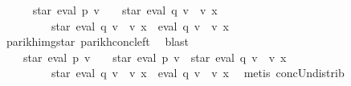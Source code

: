 \begin{isabellebody}
\ \isamarkupfalse%
\ {\isachardoublequoteopen}{\isasymdots}\ {\isacharequal}{\kern0pt}\ {\isasymPsi}\ {\isacharparenleft}{\kern0pt}star\ {\isacharparenleft}{\kern0pt}eval\ p\ v{\isacharparenright}{\kern0pt}\ {\isacharat}{\kern0pt}{\isacharat}{\kern0pt}\ {\isacharparenleft}{\kern0pt}{\isacharbraceleft}{\kern0pt}{\isacharbrackleft}{\kern0pt}{\isacharbrackright}{\kern0pt}{\isacharbraceright}{\kern0pt}\ {\isasymunion}\ star\ {\isacharparenleft}{\kern0pt}eval\ q\ v\ {\isacharat}{\kern0pt}{\isacharat}{\kern0pt}\ v\ x{\isacharparenright}{\kern0pt}\isanewline
\ \ \ \ \ \ \ \ {\isacharat}{\kern0pt}{\isacharat}{\kern0pt}\ star\ {\isacharparenleft}{\kern0pt}eval\ q\ v\ {\isacharat}{\kern0pt}{\isacharat}{\kern0pt}\ v\ x{\isacharparenright}{\kern0pt}\ {\isacharat}{\kern0pt}{\isacharat}{\kern0pt}\ eval\ q\ v\ {\isacharat}{\kern0pt}{\isacharat}{\kern0pt}\ v\ x{\isacharparenright}{\kern0pt}{\isacharparenright}{\kern0pt}{\isachardoublequoteclose}\isanewline
\ \ \ \ \ \ \isamarkupfalse%
\ parikh{\isacharunderscore}{\kern0pt}img{\isacharunderscore}{\kern0pt}star{}\ parikh{\isacharunderscore}{\kern0pt}conc{\isacharunderscore}{\kern0pt}left\ \isamarkupfalse%
\ blast\isanewline
\ \ \ \ \isamarkupfalse%
\ \isamarkupfalse%
\ {\isachardoublequoteopen}{\isasymdots}\ {\isacharequal}{\kern0pt}\ {\isasymPsi}\ {\isacharparenleft}{\kern0pt}star\ {\isacharparenleft}{\kern0pt}eval\ p\ v{\isacharparenright}{\kern0pt}\ {\isacharat}{\kern0pt}{\isacharat}{\kern0pt}\ {\isacharbraceleft}{\kern0pt}{\isacharbrackleft}{\kern0pt}{\isacharbrackright}{\kern0pt}{\isacharbraceright}{\kern0pt}\ {\isasymunion}\ star\ {\isacharparenleft}{\kern0pt}eval\ p\ v{\isacharparenright}{\kern0pt}\ {\isacharat}{\kern0pt}{\isacharat}{\kern0pt}\ star\ {\isacharparenleft}{\kern0pt}eval\ q\ v\ {\isacharat}{\kern0pt}{\isacharat}{\kern0pt}\ v\ x{\isacharparenright}{\kern0pt}\isanewline
\ \ \ \ \ \ \ \ {\isacharat}{\kern0pt}{\isacharat}{\kern0pt}\ star\ {\isacharparenleft}{\kern0pt}eval\ q\ v\ {\isacharat}{\kern0pt}{\isacharat}{\kern0pt}\ v\ x{\isacharparenright}{\kern0pt}\ {\isacharat}{\kern0pt}{\isacharat}{\kern0pt}\ eval\ q\ v\ {\isacharat}{\kern0pt}{\isacharat}{\kern0pt}\ v\ x{\isacharparenright}{\kern0pt}{\isachardoublequoteclose}\ \isamarkupfalse%
\ {\isacharparenleft}{\kern0pt}metis\ conc{\isacharunderscore}{\kern0pt}Un{\isacharunderscore}{\kern0pt}distrib{\isacharparenleft}{\kern0pt}{}{\isacharparenright}{\kern0pt}{\isacharparenright}{\kern0pt}\isanewline
\ \ \ \ \isamarkupfalse%

\end{isabellebody}
